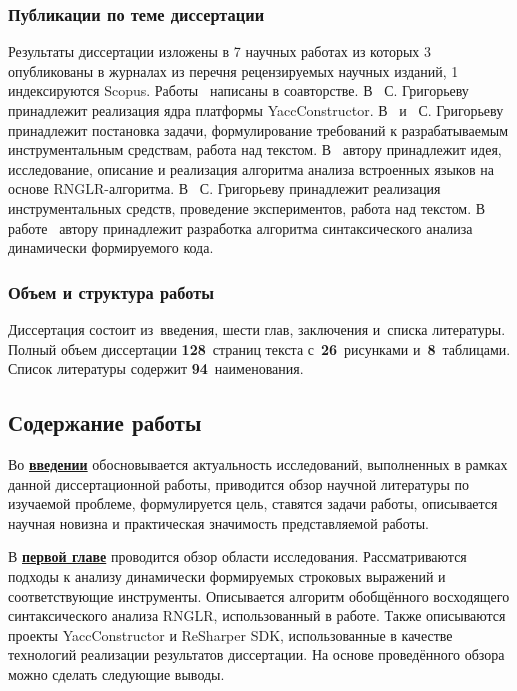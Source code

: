 \subsubsection*{\large{Публикации по теме диссертации}}

Результаты диссертации изложены в 7 научных работах из которых 3~\cite{1,2,3} опубликованы в журналах из перечня рецензируемых научных изданий, 1~\cite{4} индексируются Scopus. Работы~\cite{1, 2, 3, 4, 5, 6, 7} написаны в соавторстве. В~\cite{1} С. Григорьеву принадлежит реализация ядра платформы YaccConstructor. В~\cite{2, 3} и~\cite{5} С. Григорьеву принадлежит постановка задачи, формулирование требований к разрабатываемым инструментальным средствам, работа над текстом. В~\cite{4} автору принадлежит идея, исследование, описание и реализация алгоритма анализа встроенных языков на основе RNGLR-алгоритма.  В~\cite{6} С. Григорьеву принадлежит реализация инструментальных средств, проведение экспериментов, работа над текстом. В работе~\cite{7} автору принадлежит разработка алгоритма синтаксического анализа динамически формируемого кода.


\subsubsection*{\large{Объем и структура работы}}
Диссертация состоит из~введения, шести глав, заключения и~списка литературы. Полный объем диссертации \textbf{128}~страниц текста с~\textbf{26}~рисунками и~\textbf{8}~таблицами. Список литературы содержит \textbf{94}~наименования.

\subsection*{\Large Содержание работы}
Во \underline{\textbf{введении}} обосновывается актуальность исследований, выполненных в рамках данной диссертационной работы, приводится обзор научной литературы по изучаемой проблеме, формулируется цель, 
ставятся задачи работы, описывается научная новизна и практическая значимость представляемой работы.


В \underline{\textbf{первой главе}} проводится обзор области исследования. Рассматриваются подходы к анализу динамически формируемых строковых выражений и соответствующие инструменты. Описывается алгоритм обобщённого восходящего синтаксического анализа RNGLR, использованный в работе. Также описываются 
проекты YaccConstructor и ReSharper SDK, использованные в качестве технологий реализации результатов диссертации. На основе проведённого обзора можно сделать следующие выводы.


